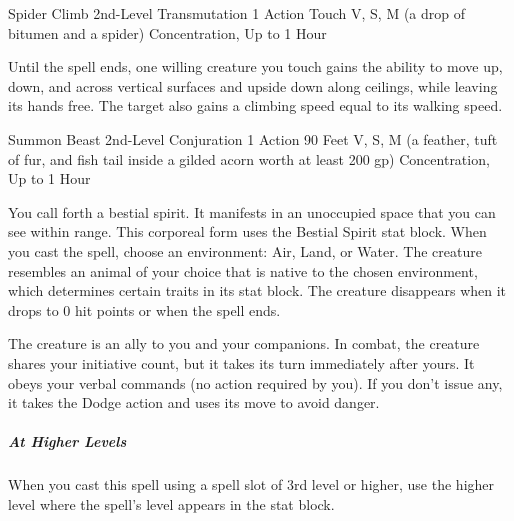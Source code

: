 \documentclass[letterpaper,openany,oneside,twocolumn]{book}
\begin{document}
\DndSpellHeader
  {Spider Climb}
  {2nd-Level Transmutation}
  {1 Action}
  {Touch}
  {V, S, M (a drop of bitumen and a spider)}
  {Concentration, Up to 1 Hour}

Until the spell ends, one willing creature you touch gains the ability to move up, down, and across vertical surfaces and upside down along ceilings, while leaving its hands free. The target also gains a climbing speed equal to its walking speed.

\DndSpellHeader
  {Summon Beast}
  {2nd-Level Conjuration}
  {1 Action}
  {90 Feet}
  {V, S, M (a feather, tuft of fur, and fish tail inside a gilded acorn worth at least 200 gp)}
  {Concentration, Up to 1 Hour}

You call forth a bestial spirit. It manifests in an unoccupied space that you can see within range. This corporeal form uses the Bestial Spirit stat block. When you cast the spell, choose an environment: Air, Land, or Water. The creature resembles an animal of your choice that is native to the chosen environment, which determines certain traits in its stat block. The creature disappears when it drops to 0 hit points or when the spell ends.

The creature is an ally to you and your companions. In combat, the creature shares your initiative count, but it takes its turn immediately after yours. It obeys your verbal commands (no action required by you). If you don't issue any, it takes the Dodge action and uses its move to avoid danger.

\subparagraph*{At Higher Levels} When you cast this spell using a spell slot of 3rd level or higher, use the higher level where the spell's level appears in the stat block.
\end{document}
